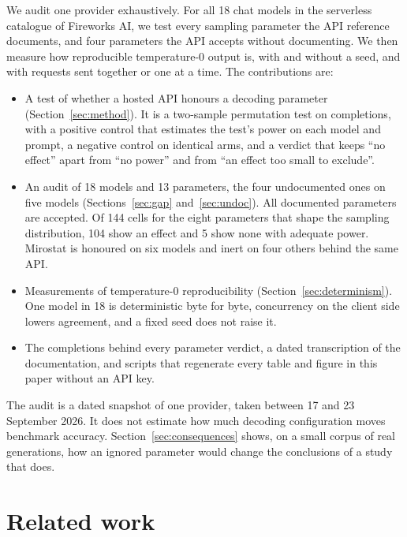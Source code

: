 \documentclass[10pt]{article}
\begin{document}
We audit one provider exhaustively. For all 18 chat models in the serverless catalogue of Fireworks AI, we test every sampling parameter the API reference documents, and four parameters the API accepts without documenting. We then measure how reproducible temperature-0 output is, with and without a seed, and with requests sent together or one at a time. The contributions are:
\begin{itemize}
\item A test of whether a hosted API honours a decoding parameter (Section~\ref{sec:method}). It is a two-sample permutation test on completions, with a positive control that estimates the test's power on each model and prompt, a negative control on identical arms, and a verdict that keeps ``no effect'' apart from ``no power'' and from ``an effect too small to exclude''.
\item An audit of 18 models and 13 parameters, the four undocumented ones on five models (Sections~\ref{sec:gap} and~\ref{sec:undoc}). All documented parameters are accepted. Of 144 cells for the eight parameters that shape the sampling distribution, 104 show an effect and 5 show none with adequate power. Mirostat is honoured on six models and inert on four others behind the same API.
\item Measurements of temperature-0 reproducibility (Section~\ref{sec:determinism}). One model in 18 is deterministic byte for byte, concurrency on the client side lowers agreement, and a fixed seed does not raise it.
\item The completions behind every parameter verdict, a dated transcription of the documentation, and scripts that regenerate every table and figure in this paper without an API key.
\end{itemize}

The audit is a dated snapshot of one provider, taken between 17 and 23 September 2026. It does not estimate how much decoding configuration moves benchmark accuracy. Section~\ref{sec:consequences} shows, on a small corpus of real generations, how an ignored parameter would change the conclusions of a study that does.

\section{Related work}
\label{sec:related}
\end{document}
